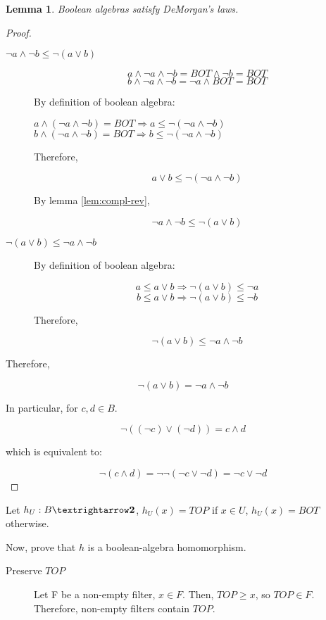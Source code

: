 \documentclass{article}
\newtheorem{lemma}{Lemma}
\begin{document}
\begin{enumerate}
\begin{enumerate}
     \begin{lemma}\label{lem:morgan}
       Boolean algebras satisfy DeMorgan's laws.
     \end{lemma}

     \begin{proof}
       \begin{description}
         \item[$¬a ∧ ¬b ≤ ¬(a ∨ b)$]

           $$a ∧ ¬a ∧ ¬b = BOT ∧ ¬b = BOT$$
           $$b ∧ ¬a ∧ ¬b = ¬a ∧ BOT = BOT$$

           By definition of boolean algebra:

           $a ∧ (¬a ∧ ¬b) = BOT \Rightarrow a ≤ ¬(¬a ∧ ¬b)$
           $b ∧ (¬a ∧ ¬b) = BOT \Rightarrow b ≤ ¬(¬a ∧ ¬b)$

           Therefore,

           $$a ∨ b ≤ ¬(¬a ∧ ¬b)$$

           By lemma \ref{lem:compl-rev},

           $$¬a ∧ ¬b ≤ ¬(a ∨ b)$$

         \item[$¬(a ∨ b) ≤ ¬a ∧ ¬b$]

           By definition of boolean algebra:

           $$a ≤ a ∨ b ⇒ ¬(a ∨ b) ≤ ¬a$$
           $$b ≤ a ∨ b ⇒ ¬(a ∨ b) ≤ ¬b$$

           Therefore,

           $$¬(a ∨ b) ≤ ¬a ∧ ¬b$$
       \end{description} 

       Therefore,

       $$¬(a ∨ b) = ¬a ∧ ¬b$$

       In particular, for $c,d ∈ B$.

       $$¬((¬c) ∨ (¬d)) = c ∧ d$$

       which is equivalent to:

       $$¬(c ∧ d) = ¬¬(¬c ∨ ¬d) = ¬c ∨ ¬d$$
     \end{proof}
     
     Let $h_U : B → \text{\bf 2}$, $h_U(x) = TOP$ if $x ∈ U$, $h_U(x) = BOT$ otherwise.

     Now, prove that $h$ is a boolean-algebra homomorphism.

     \begin{description}
       \item[Preserve $TOP$]

         Let F be a non-empty filter, $x ∈ F$. Then, $TOP ≥ x$, so
         $TOP ∈ F$. Therefore, non-empty filters contain $TOP$.


\end{description}
\end{enumerate}
\end{enumerate}
\end{document}
